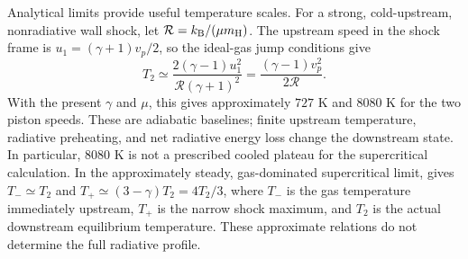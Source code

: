 \documentclass[manuscript]{aastex7}
\begin{document}
Analytical limits provide useful temperature scales. For a strong,
cold-upstream, nonradiative wall shock, let
$\mathcal{R}=k_{\rm B}/(\mu m_{\rm H})$. The upstream speed in the shock
frame is $u_1=(\gamma+1)v_p/2$, so the ideal-gas jump conditions give
\begin{equation}
 T_2\simeq\frac{2(\gamma-1)u_1^2}{\mathcal{R}(\gamma+1)^2}
       =\frac{(\gamma-1)v_p^2}{2\mathcal{R}}.
 \label{eq:shockscale}
\end{equation}
With the present $\gamma$ and $\mu$, this gives approximately $727$ K
and $8080$ K for the two piston speeds. These are adiabatic baselines;
finite upstream temperature, radiative preheating, and net radiative
energy loss change the downstream state. In particular, $8080$ K is
not a prescribed cooled plateau for the supercritical calculation.
In the approximately steady, gas-dominated supercritical limit,
\citet[pp.~283--285]{Ensman1994} gives
$T_-\simeq T_2$ and $T_+\simeq(3-\gamma)T_2=4T_2/3$, where $T_-$ is
the gas temperature immediately upstream, $T_+$ is the narrow shock
maximum, and $T_2$ is the actual downstream equilibrium temperature.
These approximate relations do not determine the full radiative profile.
\end{document}
